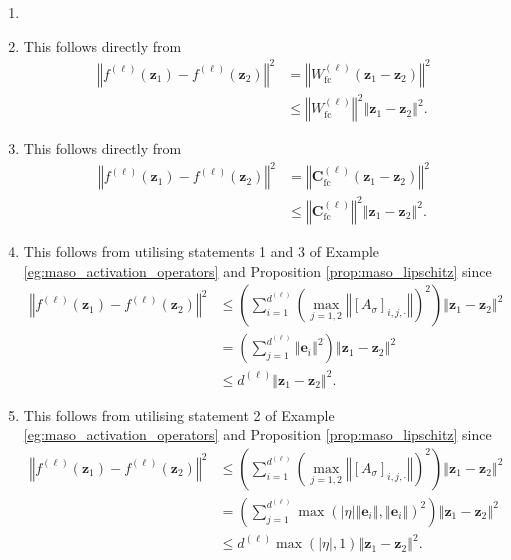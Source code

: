 \begin{tproof}
    \begin{enumerate}
        \item[]
        \item This follows directly from 
        \begin{align*}
            \left\Vert f^{(\ell)}\left(\mathbf{z}_1\right)-f^{(\ell)}\left(\mathbf{z}_2\right)\right\Vert^2&=\left\Vert W^{(\ell)}_{\text{fc}}\left(\mathbf{z}_1-\mathbf{z}_2\right)\right\Vert^2\\&\leq\left\Vert W^{(\ell)}_{\text{fc}}\right\Vert^2\left\Vert\mathbf{z}_1-\mathbf{z}_2\right\Vert^2.
        \end{align*}
        \item This follows directly from 
        \begin{align*}
            \left\Vert f^{(\ell)}\left(\mathbf{z}_1\right)-f^{(\ell)}\left(\mathbf{z}_2\right)\right\Vert^2&=\left\Vert\mathbf{C}^{(\ell)}_{\text{fc}}\left(\mathbf{z}_1-\mathbf{z}_2\right)\right\Vert^2\\&\leq\left\Vert\mathbf{C}^{(\ell)}_{\text{fc}}\right\Vert^2\left\Vert\mathbf{z}_1-\mathbf{z}_2\right\Vert^2.
        \end{align*}
        \item This follows from utilising statements 1 and 3 of Example \ref{eg:maso_activation_operators} and Proposition \ref{prop:maso_lipschitz} since
        \begin{align*}
            \left\Vert f^{(\ell)}\left(\mathbf{z}_1\right)-f^{(\ell)}\left(\mathbf{z}_2\right)\right\Vert^2&\leq\left(\sum_{i=1}^{d^{(\ell)}}\left(\max_{j=1,2}\left\Vert\left[A_{\sigma}\right]_{i,j,\cdot}\right\Vert\right)^2\right)\left\Vert\mathbf{z}_1-\mathbf{z}_2\right\Vert^2\\&=\left(\sum_{j=1}^{d^{(\ell)}}\left\Vert\mathbf{e}_i\right\Vert^2\right)\left\Vert\mathbf{z}_1-\mathbf{z}_2\right\Vert^2\\&\leq d^{(\ell)}\left\Vert\mathbf{z}_1-\mathbf{z}_2\right\Vert^2.
        \end{align*}
        \item This follows from utilising statement 2 of Example \ref{eg:maso_activation_operators} and Proposition \ref{prop:maso_lipschitz} since
        \begin{align*}
            \left\Vert f^{(\ell)}\left(\mathbf{z}_1\right)-f^{(\ell)}\left(\mathbf{z}_2\right)\right\Vert^2&\leq\left(\sum_{i=1}^{d^{(\ell)}}\left(\max_{j=1,2}\left\Vert\left[A_{\sigma}\right]_{i,j,\cdot}\right\Vert\right)^2\right)\left\Vert\mathbf{z}_1-\mathbf{z}_2\right\Vert^2\\&=\left(\sum_{j=1}^{d^{(\ell)}}\max\left(\vert\eta\vert\left\Vert\mathbf{e}_i\right\Vert,\left\Vert\mathbf{e}_i\right\Vert\right)^2\right)\left\Vert\mathbf{z}_1-\mathbf{z}_2\right\Vert^2\\&\leq d^{(\ell)}\max\left(\vert\eta\vert,1\right)\left\Vert\mathbf{z}_1-\mathbf{z}_2\right\Vert^2.

\end{align*}
\end{enumerate}
\end{tproof}
